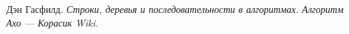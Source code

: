 \begin{thebibliography}{99}
Дэн Гасфилд.
{\itshape Строки, деревья и последовательности в алгоритмах.}
{\itshape Алгоритм Ахо — Корасик Wiki.}
\end{thebibliography}



